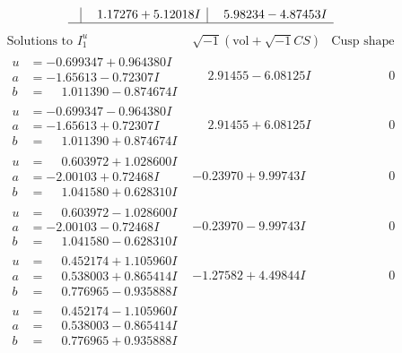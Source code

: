 \documentclass[1p]{elsarticle_modified}
\theoremstyle{definition}
\newcommand{\I}{\sqrt{-1}}
\begin{document}
$$\begin{array}{c|c|c}
 & \phantom{-}1.17276 + 5.12018 I & \phantom{-}5.98234 - 4.87453 I\\
 \hline 
 \end{array}$$\newpage$$\begin{array}{c|c|c}  
\text{Solutions to }I^u_{1}& \I (\text{vol} + \sqrt{-1}CS) & \text{Cusp shape}\\
 \hline 
\begin{aligned}
u &= -0.699347 + 0.964380 I \\
a &= -1.65613 - 0.72307 I \\
b &= \phantom{-}1.011390 - 0.874674 I\end{aligned}
 & \phantom{-}2.91455 - 6.08125 I & \phantom{-0.000000 } 0 \\ \hline\begin{aligned}
u &= -0.699347 - 0.964380 I \\
a &= -1.65613 + 0.72307 I \\
b &= \phantom{-}1.011390 + 0.874674 I\end{aligned}
 & \phantom{-}2.91455 + 6.08125 I & \phantom{-0.000000 } 0 \\ \hline\begin{aligned}
u &= \phantom{-}0.603972 + 1.028600 I \\
a &= -2.00103 + 0.72468 I \\
b &= \phantom{-}1.041580 + 0.628310 I\end{aligned}
 & -0.23970 + 9.99743 I & \phantom{-0.000000 } 0 \\ \hline\begin{aligned}
u &= \phantom{-}0.603972 - 1.028600 I \\
a &= -2.00103 - 0.72468 I \\
b &= \phantom{-}1.041580 - 0.628310 I\end{aligned}
 & -0.23970 - 9.99743 I & \phantom{-0.000000 } 0 \\ \hline\begin{aligned}
u &= \phantom{-}0.452174 + 1.105960 I \\
a &= \phantom{-}0.538003 + 0.865414 I \\
b &= \phantom{-}0.776965 - 0.935888 I\end{aligned}
 & -1.27582 + 4.49844 I & \phantom{-0.000000 } 0 \\ \hline\begin{aligned}
u &= \phantom{-}0.452174 - 1.105960 I \\
a &= \phantom{-}0.538003 - 0.865414 I \\
b &= \phantom{-}0.776965 + 0.935888 I\end{aligned}

\end{array}$$
\end{document}
